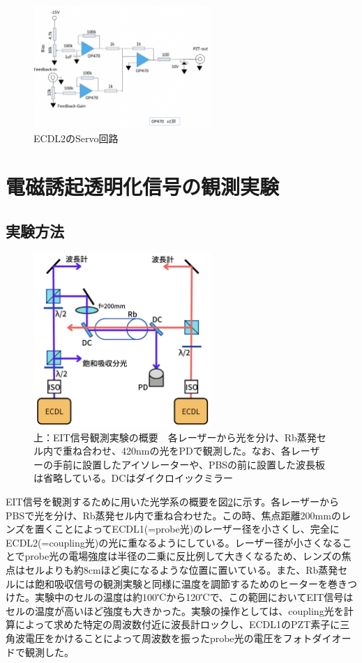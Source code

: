\documentclass[dvipdfmx]{jsarticle}
\begin{document}
\begin{figure}
\centering
\includegraphics[width=0.6\textwidth]{images/wave_servo.png}
\caption{\label{fig:wave-servo}ECDL2のServo回路}
\end{figure}

\clearpage
\section{電磁誘起透明化信号の観測実験}
\subsection{実験方法}
\begin{figure}
\centering
\includegraphics[width=0.6\textwidth]{images/eit.png}
\caption{\label{fig:eit}上：EIT信号観測実験の概要　各レーザーから光を分け、Rb蒸発セル内で重ね合わせ、420nmの光をPDで観測した。なお、各レーザーの手前に設置したアイソレーターや、PBSの前に設置した波長板は省略している。DCはダイクロイックミラー}
\end{figure}
EIT信号を観測するために用いた光学系の概要を図\ref{fig:eit}に示す。各レーザーからPBSで光を分け、Rb蒸発セル内で重ね合わせた。この時、焦点距離200mmのレンズを置くことによってECDL1(=probe光)のレーザー径を小さくし、完全にECDL2(=coupling光)の光に重なるようにしている。レーザー径が小さくなることでprobe光の電場強度は半径の二乗に反比例して大きくなるため、レンズの焦点はセルよりも約8cmほど奥になるような位置に置いている。また、Rb蒸発セルには飽和吸収信号の観測実験と同様に温度を調節するためのヒーターを巻きつけた。実験中のセルの温度は約100℃から120℃で、この範囲においてEIT信号はセルの温度が高いほど強度も大きかった。実験の操作としては、coupling光を計算によって求めた特定の周波数付近に波長計ロックし、ECDL1のPZT素子に三角波電圧をかけることによって周波数を振ったprobe光の電圧をフォトダイオードで観測した。
\end{document}
